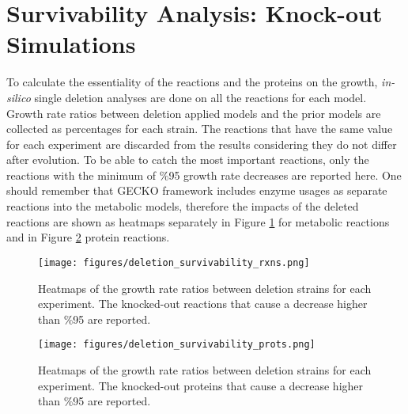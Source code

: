 \section{Survivability Analysis: Knock-out Simulations}
To calculate the essentiality of the reactions and the proteins on the growth, \emph{in-silico} single deletion analyses are done on all the reactions for each model. Growth rate ratios between deletion applied models and the prior models are collected as percentages for each strain. The reactions that have the same value for each experiment are discarded from the results considering they do not differ after evolution. To be able to catch the most important reactions, only the reactions with the minimum of \%95 growth rate decreases are reported here. One should remember that GECKO framework includes enzyme usages as separate reactions into the metabolic models, therefore the impacts of the deleted reactions are shown as heatmaps separately in Figure \ref{fig:deletion_survivability_rxns} for metabolic reactions and in Figure \ref{fig:deletion_survivability_prots} protein reactions.

\begin{figure}[H]
  \begin{center}
  \texttt{[image: figures/deletion\_survivability\_rxns.png]}
  \caption[Heatmaps of the growth rate ratios between deletion strains for each experiment. The knocked-out reactions that cause a decrease higher than \%95 are reported.]{Heatmaps of the growth rate ratios between deletion strains for each experiment. The knocked-out reactions that cause a decrease higher than \%95 are reported.}
  \label{fig:deletion_survivability_rxns}
  \end{center}
\end{figure}

\begin{figure}[H]
  \begin{center}
  \texttt{[image: figures/deletion\_survivability\_prots.png]}
  \caption[Heatmaps of the growth rate ratios between deletion strains for each experiment. The knocked-out proteins that cause a decrease higher than \%95 are reported.]{Heatmaps of the growth rate ratios between deletion strains for each experiment. The knocked-out proteins that cause a decrease higher than \%95 are reported.}
  \label{fig:deletion_survivability_prots}
  \end{center}
\end{figure}

